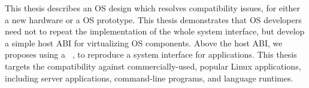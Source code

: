 This thesis describes an OS design which resolves compatibility issues, for either a new hardware or a OS prototype.
This thesis demonstrates that OS developers need not to repeat the implementation of
the whole system interface,
but develop a simple host ABI for virtualizing OS components.
Above the host ABI, we proposes using a  \libos{}~\cite{porter11drawbridge,engler95exokernel,libra,unikernels},
to reproduce a system interface for applications.
This thesis targets the compatibility against commercially-used, popular Linux applications, including server applications, command-line programs, and language runtimes.




